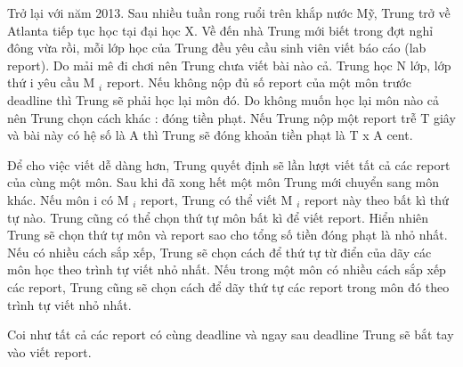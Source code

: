 Trở lại với năm 2013. Sau nhiều tuần rong ruổi trên khắp nước Mỹ, Trung trở về Atlanta tiếp tục học tại đại học X. Về đến nhà Trung mới biết trong đợt nghỉ đông vừa rồi, mỗi lớp học của Trung đều yêu cầu sinh viên viết báo cáo (lab report). Do mải mê đi chơi nên Trung chưa viết bài nào cả. Trung học N lớp, lớp thứ i yêu cầu M $_ i $ report. Nếu không nộp đủ số report của một môn trước deadline thì Trung sẽ phải học lại môn đó. Do không muốn học lại môn nào cả nên Trung chọn cách khác : đóng tiền phạt. Nếu Trung nộp một report trễ T giây và bài này có hệ số là A thì Trung sẽ đóng khoản tiền phạt là T x A cent.

Để cho việc viết dễ dàng hơn, Trung quyết định sẽ lần lượt viết tất cả các report của cùng một môn. Sau khi đã xong hết một môn Trung mới chuyển sang môn khác. Nếu môn i có M $_ i $ report, Trung có thể viết M $_ i $ report này theo bất kì thứ tự nào. Trung cũng có thể chọn thứ tự môn bất kì để viết report. Hiển nhiên Trung sẽ chọn thứ tự môn và report sao cho tổng số tiền đóng phạt là nhỏ nhất. Nếu có nhiều cách sắp xếp, Trung sẽ chọn cách để thứ tự từ điển của dãy các môn học theo trình tự viết nhỏ nhất. Nếu trong một môn có nhiều cách sắp xếp các report, Trung cũng sẽ chọn cách để dãy thứ tự các report trong môn đó theo trình tự viết nhỏ nhất.

Coi như tất cả các report có cùng deadline và ngay sau deadline Trung sẽ bắt tay vào viết report.